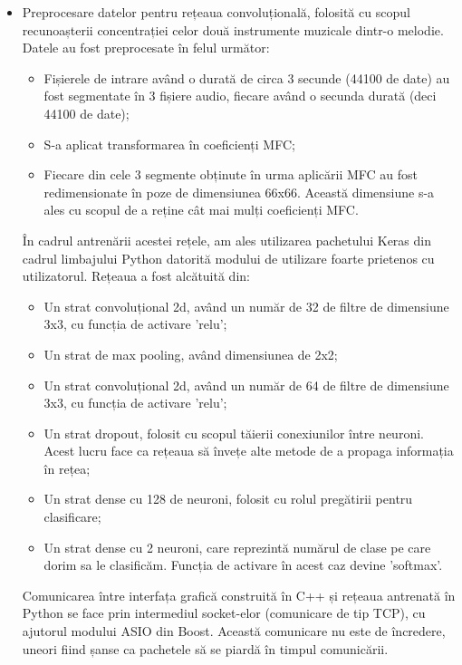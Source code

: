 \documentclass[a4paper,12pt]{report}
\begin{document}
   \begin{itemize}
   	\item Preprocesare datelor pentru rețeaua convoluțională, folosită cu scopul recunoașterii concentrației celor două instrumente muzicale dintr-o melodie. Datele au fost preprocesate în felul următor:
   		\begin{itemize}
   			\item Fișierele de intrare având o durată de circa 3 secunde (44100 de date) au fost segmentate în 3 fișiere audio, fiecare având o secunda durată (deci 44100 de date);
   			\item S-a aplicat transformarea în coeficienți MFC;
   			\item Fiecare din cele 3 segmente obținute în urma aplicării MFC au fost redimensionate în poze de dimensiunea 66x66. Această dimensiune s-a ales cu scopul de a reține cât mai mulți coeficienți MFC.
   		\end{itemize}
   	
   	În cadrul antrenării acestei rețele, am ales utilizarea pachetului Keras din cadrul limbajului Python datorită modului de utilizare foarte prietenos cu utilizatorul. Rețeaua a fost alcătuită din:
   		\begin{itemize}
   			\item Un strat convoluțional 2d, având un număr de 32 de filtre de dimensiune 3x3, cu funcția de activare 'relu';
   			\item Un strat de max pooling, având dimensiunea de 2x2;
   			\item Un strat convoluțional 2d, având un număr de 64 de filtre de dimensiune 3x3, cu funcția de activare 'relu';
   			\item Un strat dropout, folosit cu scopul tăierii conexiunilor între neuroni. Acest lucru face ca rețeaua să învețe alte metode de a propaga informația în rețea;
   			\item Un strat dense cu 128 de neuroni, folosit cu rolul pregătirii pentru clasificare;
   			\item Un strat dense cu 2 neuroni, care reprezintă numărul de clase pe care dorim sa le clasificăm. Funcția de activare în acest caz devine 'softmax'.
   		\end{itemize} 
   	Comunicarea între interfața grafică construită în C++ și rețeaua antrenată în Python se face prin intermediul socket-elor (comunicare de tip TCP), cu ajutorul modului ASIO din Boost. Această comunicare nu este de încredere, uneori fiind șanse ca pachetele să se piardă în timpul comunicării.
   	

\end{itemize}
\end{document}
